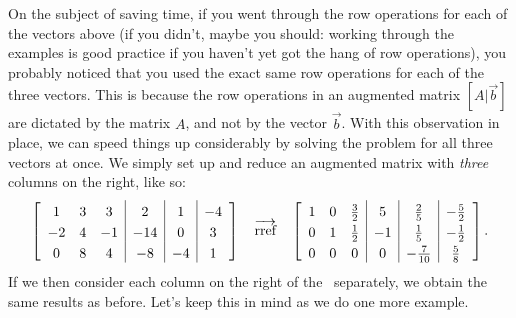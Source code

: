 On the subject of saving time, if you went through the row operations for each of the vectors above (if you didn't, maybe you should: working through the examples is good practice if you haven't yet got the hang of row operations), you probably noticed that you used the exact same row operations for each of the three vectors. This is because the row operations in an augmented matrix $[A|\vec{b}]$ are dictated by the matrix $A$, and not by the vector $\vec{b}$. With this observation in place, we can speed things up considerably by solving the problem for all three vectors at once. We simply set up and reduce an augmented matrix with \textit{three} columns on the right, like so:
\[\extrarowheight=3pt
\left[\begin{array}{ccc|c|c|c}1&3&3&2&1&-4\\ -2&4&-1&-14&0&3\\0&8&4&-8&-4&1 \end{array}\right] \quad \overrightarrow{\text{rref}}\quad \left[\begin{array}{ccc|c|c|c} 1&0&\frac32&5&\frac25 &-\frac52 \\0&1&\frac12&-1&\frac15 &-\frac 12\\0&0&0&0&-\frac{7}{10}&\frac58 \end{array}\right].
\]
If we then consider each column on the right of the \rref\ separately, we obtain the same results as before. Let's keep this in mind as we do one more example.

\medskip


